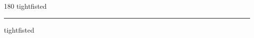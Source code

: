 
\begin{frame}
\begin{center}
\begin{turn}{180}
{\fontsize{2.5cm}{1em}\selectfont tightfisted}
\end{turn}
\vspace{1em}\par  
\hrule
\vspace{1em}\par  
{\fontsize{2.5cm}{1em}\selectfont tightfisted}
\end{center}
\end{frame}
